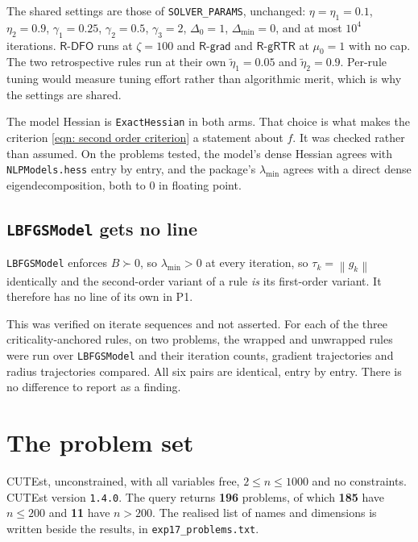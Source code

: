 \documentclass[11pt,a4paper]{article}
\providecommand{\norm}[1]{\left \lVert #1 \right \rVert}
\providecommand{\Rdfo}{\textsf{R-DFO}}
\providecommand{\Rgrad}{\textsf{R-grad}}
\providecommand{\Rgrtr}{\textsf{R-gRTR}}
\providecommand{\gone}{\gamma_1}
\providecommand{\gtwo}{\gamma_2}
\providecommand{\gthree}{\gamma_3}
\theoremstyle{remark}
\begin{document}
The shared settings are those of \texttt{SOLVER\_PARAMS}, unchanged:
$\eta = \eta_1 = 0.1$, $\eta_2 = 0.9$, $\gone = 0.25$, $\gtwo = 0.5$,
$\gthree = 2$, $\Delta_0 = 1$, $\Delta_{\min} = 0$, and at most $10^4$ iterations.
$\Rdfo$ runs at $\zeta = 100$ and $\Rgrad$ and $\Rgrtr$ at $\mu_0 = 1$ with no
cap. The two retrospective rules run at their own $\tilde\eta_1 = 0.05$ and
$\tilde\eta_2 = 0.9$. Per-rule tuning would measure tuning effort rather than
algorithmic merit, which is why the settings are shared.

The model Hessian is \texttt{ExactHessian} in both arms. That choice is what makes
the criterion \eqref{eqn: second order criterion} a statement about $f$. It was
checked rather than assumed. On the problems tested, the model's dense Hessian
agrees with \texttt{NLPModels.hess} entry by entry, and the package's
$\lambda_{\min}$ agrees with a direct dense eigendecomposition, both to $0$ in
floating point.

\subsection{\texttt{LBFGSModel} gets no line}\label{sec: lbfgs}

\texttt{LBFGSModel} enforces $B \succ 0$, so $\lambda_{\min} > 0$ at every
iteration, so $\tau_k = \norm{g_k}$ identically and the second-order variant of a
rule \emph{is} its first-order variant. It therefore has no line of its own in P1.

This was verified on iterate sequences and not asserted. For each of the three
criticality-anchored rules, on two problems, the wrapped and unwrapped rules were
run over \texttt{LBFGSModel} and their iteration counts, gradient trajectories and
radius trajectories compared. All six pairs are identical, entry by entry. There
is no difference to report as a finding.

\section{The problem set}\label{sec: problems}

CUTEst, unconstrained, with all variables free, $2 \leq n \leq 1000$ and no
constraints. CUTEst version \texttt{1.4.0}. The query returns \textbf{196}
problems, of which \textbf{185} have $n \leq 200$ and \textbf{11} have $n > 200$.
The realised list of names and dimensions is written beside the results, in
\texttt{exp17\_problems.txt}.
\end{document}

